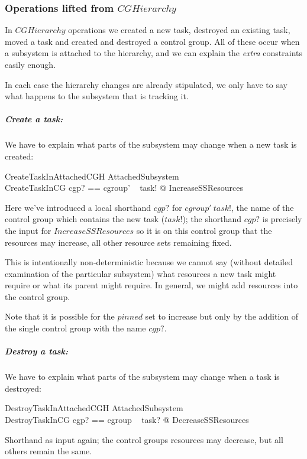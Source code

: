 \documentclass[a4paper,twoside,12pt]{article}
\begin{document}
\subsubsection{Operations lifted from $CGHierarchy$}

In $CGHierarchy$ operations we created a new task, destroyed an existing task, moved a task and created and destroyed
a control group.  All of these occur when a subsystem is attached to the hierarchy, and we can explain the \emph{extra}
constraints easily enough.

In each case the hierarchy changes are already stipulated, we only have to say what happens to the subsystem that is
tracking it.

\subparagraph{Create a task:}
We have to explain what parts of the subsystem may change when a new task is created:

\begin{schema}{CreateTaskInAttachedCGH}
\Delta AttachedSubsystem \\
CreateTaskInCG
\where
\LET cgp? == cgroup' ~ task! @ IncreaseSSResources
\end{schema}
Here we've introduced a local shorthand $cgp?$ for $cgroup' ~ task!$, the name of the control group which contains
the new task ($task!$); the shorthand $cgp?$ is precisely the input for $IncreaseSSResources$ so 
it is on this control group that the resources may increase, all other resource sets
remaining fixed.

This is intentionally non-deterministic because we cannot say 
(without detailed examination of the particular subsystem) 
what resources a new task might require or
what its parent might require. In general, we might add resources into the control group.

Note that it is possible for the $pinned$ set to increase but only by the addition of the single control group
with the name $cgp?$.

\subparagraph{Destroy a task:}
We have to explain what parts of the subsystem may change when a task is destroyed:

\begin{schema}{DestroyTaskInAttachedCGH}
\Delta AttachedSubsystem \\
DestroyTaskInCG
\where
\LET cgp? == cgroup ~ task? @ DecreaseSSResources
\end{schema}
Shorthand as input again;  the control groups resources may decrease, but all others remain the same.
\end{document}
